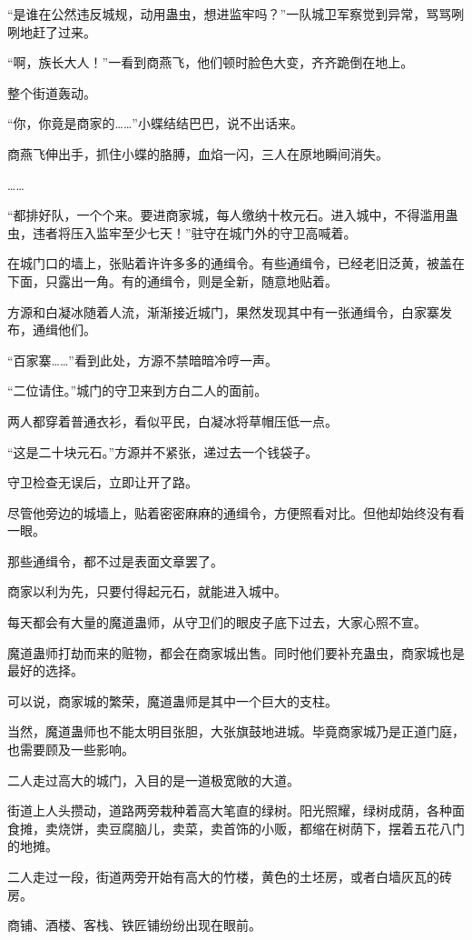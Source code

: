 \begin{this_body}
“是谁在公然违反城规，动用蛊虫，想进监牢吗？”一队城卫军察觉到异常，骂骂咧咧地赶了过来。

“啊，族长大人！”一看到商燕飞，他们顿时脸色大变，齐齐跪倒在地上。

整个街道轰动。

“你，你竟是商家的……”小蝶结结巴巴，说不出话来。

商燕飞伸出手，抓住小蝶的胳膊，血焰一闪，三人在原地瞬间消失。

……

“都排好队，一个个来。要进商家城，每人缴纳十枚元石。进入城中，不得滥用蛊虫，违者将压入监牢至少七天！”驻守在城门外的守卫高喊着。

在城门口的墙上，张贴着许许多多的通缉令。有些通缉令，已经老旧泛黄，被盖在下面，只露出一角。有的通缉令，则是全新，随意地贴着。

方源和白凝冰随着人流，渐渐接近城门，果然发现其中有一张通缉令，白家寨发布，通缉他们。

“百家寨……”看到此处，方源不禁暗暗冷哼一声。

“二位请住。”城门的守卫来到方白二人的面前。

两人都穿着普通衣衫，看似平民，白凝冰将草帽压低一点。

“这是二十块元石。”方源并不紧张，递过去一个钱袋子。

守卫检查无误后，立即让开了路。

尽管他旁边的城墙上，贴着密密麻麻的通缉令，方便照看对比。但他却始终没有看一眼。

那些通缉令，都不过是表面文章罢了。

商家以利为先，只要付得起元石，就能进入城中。

每天都会有大量的魔道蛊师，从守卫们的眼皮子底下过去，大家心照不宣。

魔道蛊师打劫而来的赃物，都会在商家城出售。同时他们要补充蛊虫，商家城也是最好的选择。

可以说，商家城的繁荣，魔道蛊师是其中一个巨大的支柱。

当然，魔道蛊师也不能太明目张胆，大张旗鼓地进城。毕竟商家城乃是正道门庭，也需要顾及一些影响。

二人走过高大的城门，入目的是一道极宽敞的大道。

街道上人头攒动，道路两旁栽种着高大笔直的绿树。阳光照耀，绿树成荫，各种面食摊，卖烧饼，卖豆腐脑儿，卖菜，卖首饰的小贩，都缩在树荫下，摆着五花八门的地摊。

二人走过一段，街道两旁开始有高大的竹楼，黄色的土坯房，或者白墙灰瓦的砖房。

商铺、酒楼、客栈、铁匠铺纷纷出现在眼前。


\end{this_body}
